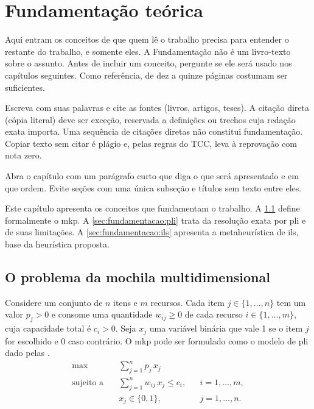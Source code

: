 \chapter{Fundamentação teórica}
\label{cap:fundamentacao}

\begin{instrucao}
Aqui entram os conceitos de que quem lê o trabalho precisa para entender o restante do
trabalho, e somente eles. A Fundamentação não é um livro-texto sobre o
assunto. Antes de incluir um conceito, pergunte se ele será usado nos
capítulos seguintes. Como referência, de dez a quinze páginas costumam ser
suficientes.

Escreva com suas palavras e cite as fontes (livros, artigos, teses). A citação
direta (cópia literal) deve ser exceção, reservada a definições ou trechos
cuja redação exata importa. Uma sequência de citações diretas não constitui
fundamentação. Copiar texto sem citar é plágio e, pelas regras do TCC, leva à
reprovação com nota zero.

Abra o capítulo com um parágrafo curto que diga o que será apresentado e em
que ordem. Evite seções com uma única subseção e títulos sem texto entre eles.
\end{instrucao}

Este capítulo apresenta os conceitos que fundamentam o trabalho. A
\cref{sec:fundamentacao:mkp} define formalmente o \acs{mkp}. A
\cref{sec:fundamentacao:pli} trata da resolução exata por \acl{pli} e de suas
limitações. A \cref{sec:fundamentacao:ils} apresenta a metaheurística de
\acl{ils}, base da heurística proposta.

\section{O problema da mochila multidimensional}
\label{sec:fundamentacao:mkp}

Considere um conjunto de $n$ itens e $m$ recursos. Cada item $j \in \{1, \ldots, n\}$
tem um valor $p_j > 0$ e consome uma quantidade $w_{ij} \geq 0$ de cada recurso
$i \in \{1, \ldots, m\}$, cuja capacidade total é $c_i > 0$. Seja $x_j$ uma
variável binária que vale 1 se o item $j$ for escolhido e 0 caso contrário. O
\acs{mkp} pode ser formulado como o modelo de \acs{pli} dado pelas
 \cite{kellerer2004knapsack}.
\begin{align}
  \max \quad & \sum_{j=1}^{n} p_j \, x_j \label{eq:mkp:objetivo} \\
  \text{sujeito a} \quad & \sum_{j=1}^{n} w_{ij} \, x_j \leq c_i,
      && i = 1, \ldots, m, \label{eq:mkp:capacidade} \\
  & x_j \in \{0, 1\}, && j = 1, \ldots, n. \label{eq:mkp:dominio}
\end{align}

